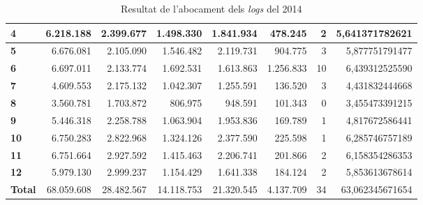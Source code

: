 \begin{table}[h!]
\begin{adjustbox}{width=1.2\textwidth, center}
\begin{tabular}{|l|r|r|r|r|r|r|r|}
            \textbf{4}     & 6.218.188  & 2.399.677  & 1.498.330  & 1.841.934  & 478.245   & 2  & 5,641371782621  \\
            \midrule
            \textbf{5}     & 6.676.081  & 2.105.090  & 1.546.482  & 2.119.731  & 904.775   & 3  & 5,877751791477  \\
            \textbf{6}     & 6.697.011  & 2.133.774  & 1.692.531  & 1.613.863  & 1.256.833 & 10 & 6,439312525590  \\
            \textbf{7}     & 4.609.553  & 2.175.132  & 1.042.307  & 1.255.591  & 136.520   & 3  & 4,431832444668  \\
            \textbf{8}     & 3.560.781  & 1.703.872  & 806.975    & 948.591    & 101.343   & 0  & 3,455473391215  \\
            \midrule
            \textbf{9}     & 5.446.318  & 2.258.788  & 1.063.904  & 1.953.836  & 169.789   & 1  & 4,817672586441  \\
            \textbf{10}    & 6.750.283  & 2.822.968  & 1.324.126  & 2.377.590  & 225.598   & 1  & 6,285746757189  \\
            \textbf{11}    & 6.751.664  & 2.927.592  & 1.415.463  & 2.206.741  & 201.866   & 2  & 6,158354286353  \\
            \textbf{12}    & 5.979.130  & 2.999.237  & 1.154.429  & 1.641.338  & 184.124   & 2  & 5,853613678614  \\
            \midrule
            \textbf{Total} & 68.059.608 & 28.482.567 & 14.118.753 & 21.320.545 & 4.137.709 & 34 & 63,062345671654 \\
            \bottomrule
        \end{tabular}
    \end{adjustbox}
    \caption{Resultat de l'abocament dels \textit{logs} del 2014}
    \label{tab:logs-table-2014}
\end{table}
